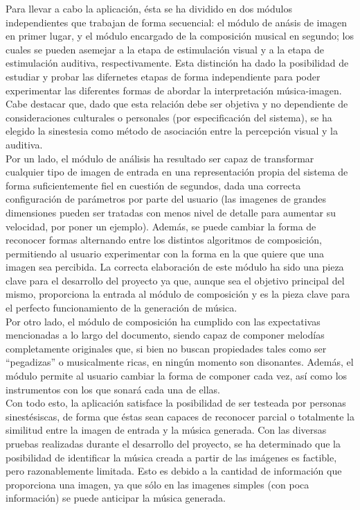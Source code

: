 Para llevar a cabo la aplicación, ésta se ha dividido en dos módulos independientes que trabajan de forma secuencial: el módulo de anásis de imagen en primer lugar, y el módulo encargado de la composición musical en segundo; los cuales se pueden asemejar a la etapa de estimulación visual y a la etapa de estimulación auditiva, respectivamente. Esta distinción ha dado la posibilidad de estudiar y probar las difernetes etapas de forma independiente para poder experimentar las diferentes formas de abordar la interpretación música-imagen. Cabe destacar que, dado que esta relación debe ser objetiva y no dependiente de consideraciones culturales o personales (por especificación del sistema), se ha elegido la sinestesia como método de asociación entre la percepción visual y la auditiva.\\


Por un lado, el módulo de análisis ha resultado ser capaz de transformar cualquier tipo de imagen de entrada en una representación propia del sistema de forma suficientemente fiel en cuestión de segundos, dada una correcta configuración de parámetros por parte del usuario (las imagenes de grandes dimensiones pueden ser tratadas con menos nivel de detalle para aumentar su velocidad, por poner un ejemplo). Además, se puede cambiar la forma de reconocer formas alternando entre los distintos algoritmos de composición, permitiendo al usuario experimentar con la forma en la que quiere que una imagen sea percibida. La correcta elaboración de este módulo ha sido una pieza clave para el desarrollo del proyecto ya que, aunque sea el objetivo principal del mismo, proporciona la entrada al módulo de composición y es la pieza clave para el perfecto funcionamiento de la generación de música.\\

Por otro lado, el módulo de composición ha cumplido con las expectativas mencionadas a lo largo del documento, siendo capaz de componer melodías completamente originales que, si bien no buscan propiedades tales como ser ``pegadizas'' o musicalmente ricas, en ningún momento son disonantes. Además, el módulo permite al usuario cambiar la forma de componer cada vez, así como los instrumentos con los que sonará cada una de ellas.\\

Con todo esto, la aplicación satisface la posibilidad de ser testeada por personas sinestésiscas, de forma que éstas sean capaces de reconocer parcial o totalmente la similitud entre la imagen de entrada y la música generada. Con las diversas pruebas realizadas durante el desarrollo del proyecto, se ha determinado que la posibilidad de identificar la música creada a partir de las imágenes es factible, pero razonablemente limitada. Esto es debido a la cantidad de información que proporciona una imagen, ya que sólo en las imagenes simples (con poca información) se puede anticipar la música generada.\\


